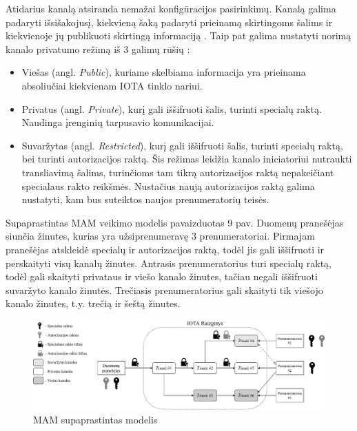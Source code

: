 Atidarius kanalą atsiranda nemažai konfigūracijos pasirinkimų. Kanalą galima padaryti išsišakojusį, kiekvieną šaką padaryti prieinamą skirtingoms šalims ir kiekvienoje jų publikuoti skirtingą informaciją \cite{ab2018iota}. Taip pat galima nustatyti norimą kanalo privatumo režimą iš 3 galimų rūšių \cite{paul2017introducing}:
\begin{itemize}
    \item Viešas (angl. \textit{Public}), kuriame skelbiama informacija yra prieinama absoliučiai kiekvienam IOTA tinklo nariui.
    \item Privatus (angl. \textit{Private}), kurį gali iššifruoti šalis, turinti specialų raktą. Naudinga įrenginių tarpusavio komunikacijai.
    \item Suvaržytas (angl. \textit{Restricted}), kurį gali iššifruoti šalis, turinti specialų raktą, bei turinti autorizacijos raktą. Šis režimas leidžia kanalo iniciatoriui nutraukti transliavimą šalims, turinčioms tam tikrą autorizacijos raktą nepakeičiant specialaus rakto reikšmės. Nustačius naują autorizacijos raktą galima nustatyti, kam bus suteiktos naujos prenumeratorių teisės.
\end{itemize}

Supaprastintas MAM veikimo modelis pavaizduotas 9 pav. Duomenų pranešėjas siunčia žinutes, kurias yra užsiprenumeravę 3 prenumeratoriai. Pirmajam pranešėjas atskleidė specialų ir autorizacijos raktą, todėl jis gali iššifruoti ir perskaityti visų kanalų žinutes. Antrasis prenumeratorius turi specialų raktą, todėl gali skaityti privataus ir viešo kanalo žinutes, tačiau negali iššifruoti suvaržyto kanalo žinutės. Trečiasis prenumeratorius gali skaityti tik viešojo kanalo žinutes, t.y. trečią ir šeštą žinutes.

\begin{figure}[H]
    \centering
    \includegraphics[scale=0.51]{images/mam-example}
    \caption{MAM supaprastintas modelis}
\end{figure}




